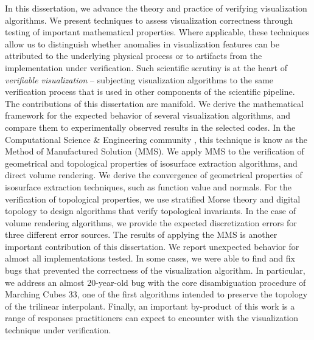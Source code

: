
In this dissertation, we advance the theory and practice of verifying visualization {algori\-thms}.
%
We present techniques to assess visualization correctness  through testing of important mathematical properties. Where applicable, these techniques allow us to distinguish
 whether anomalies in visualization features can be attributed to the
  underlying physical process or to artifacts from the implementation under verification.
Such scientific scrutiny is at the heart of {\em
    verifiable visualization} -- subjecting visualization algorithms
  to the same verification process that is used in other components of
  the scientific pipeline.  The contributions of this dissertation are manifold. We derive the mathematical framework for
  the expected behavior of several 
  visualization algorithms,
  and compare them to experimentally observed results in the selected
  codes.  In the Computational Science \& Engineering community \cse, this technique is know as the Method of Manufactured Solution (MMS). We apply MMS to the verification of geometrical and topological properties of isosurface extraction algorithms, and direct volume rendering. 
We derive the convergence of geometrical properties of isosurface extraction techniques, such as function value and normals. For the verification of topological properties, we use stratified Morse theory and digital topology to
design algorithms that verify topological invariants. In the case of volume rendering algorithms, we provide the expected discretization errors for three different error sources.
The results of applying the MMS is another important contribution of this dissertation. 
%
We report unexpected behavior for almost all implementations tested. In some cases, we were able to find and fix bugs that prevented the correctness of the visualization algorithm. 
%
In particular,  we address an almost 20-year-old bug with the core disambiguation procedure of  Marching Cubes 33, one of the first algorithms intended to preserve the topology of the trilinear interpolant. 
%
Finally,  an important by-product of this work is a range of responses practitioners can expect to encounter with the visualization technique under verification. 
  